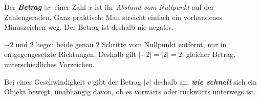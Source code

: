 \begin{theoriebox}
Der \textbf{\emph{Betrag}} $\lvert x\rvert$ einer Zahl $x$ ist ihr \emph{Abstand vom
Nullpunkt} auf der Zahlengeraden. Ganz praktisch: Man streicht einfach
ein vorhandenes Minuszeichen weg. Der Betrag ist deshalb nie negativ.

\begin{center}
\end{center}

$-2$ und $2$ liegen beide genau $2$ Schritte vom Nullpunkt entfernt,
nur in entgegengesetzte Richtungen. Deshalb gilt $\lvert -2\rvert =
\lvert 2\rvert = 2$: gleicher Betrag, unterschiedliches Vorzeichen.

Bei einer Geschwindigkeit $v$ gibt der Betrag $\lvert v\rvert$ deshalb an,
\textbf{\emph{wie schnell}} sich ein Objekt bewegt, unabhängig davon, ob es
vorwärts oder rückwärts unterwegs ist.
\end{theoriebox}

